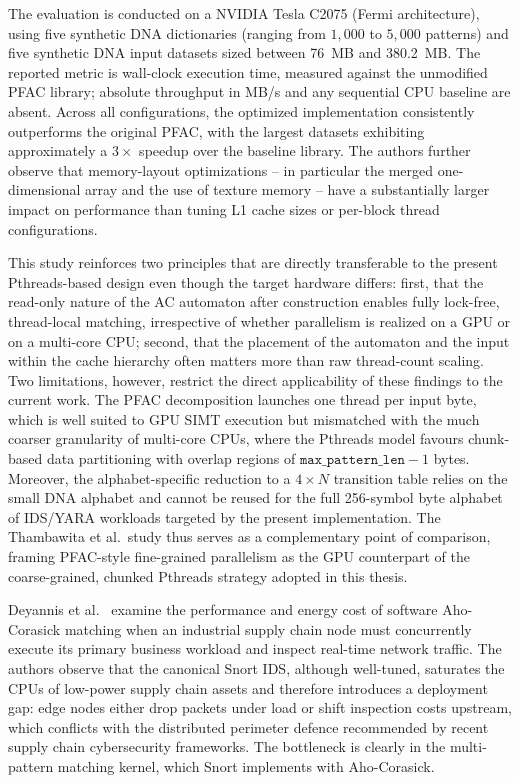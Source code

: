 The evaluation is conducted on a NVIDIA Tesla C2075 (Fermi architecture), using five synthetic DNA dictionaries (ranging from $1{,}000$ to $5{,}000$ patterns) and five synthetic DNA input datasets sized between 76~MB and 380.2~MB. The reported metric is wall-clock execution time, measured against the unmodified PFAC library; absolute throughput in MB/s and any sequential CPU baseline are absent. Across all configurations, the optimized implementation consistently outperforms the original PFAC, with the largest datasets exhibiting approximately a $3\times$ speedup over the baseline library. The authors further observe that memory-layout optimizations -- in particular the merged one-dimensional array and the use of texture memory -- have a substantially larger impact on performance than tuning L1 cache sizes or per-block thread configurations.

This study reinforces two principles that are directly transferable to the present Pthreads-based design even though the target hardware differs: first, that the read-only nature of the AC automaton after construction enables fully lock-free, thread-local matching, irrespective of whether parallelism is realized on a GPU or on a multi-core CPU; second, that the placement of the automaton and the input within the cache hierarchy often matters more than raw thread-count scaling. Two limitations, however, restrict the direct applicability of these findings to the current work. The PFAC decomposition launches one thread per input byte, which is well suited to GPU SIMT execution but mismatched with the much coarser granularity of multi-core CPUs, where the Pthreads model favours chunk-based data partitioning with overlap regions of $\texttt{max\_pattern\_len}-1$ bytes. Moreover, the alphabet-specific reduction to a $4 \times N$ transition table relies on the small DNA alphabet and cannot be reused for the full 256-symbol byte alphabet of IDS/YARA workloads targeted by the present implementation. The Thambawita et al.\ study thus serves as a complementary point of comparison, framing PFAC-style fine-grained parallelism as the GPU counterpart of the coarse-grained, chunked Pthreads strategy adopted in this thesis.



Deyannis et al.\ \cite{Deyannis2022Diversification} examine the performance and energy cost of software Aho-Corasick matching when an industrial supply chain node must concurrently execute its primary business workload and inspect real-time network traffic. The authors observe that the canonical Snort IDS, although well-tuned, saturates the CPUs of low-power supply chain assets and therefore introduces a deployment gap: edge nodes either drop packets under load or shift inspection costs upstream, which conflicts with the distributed perimeter defence recommended by recent supply chain cybersecurity frameworks. The bottleneck is clearly in the multi-pattern matching kernel, which Snort implements with Aho-Corasick.

